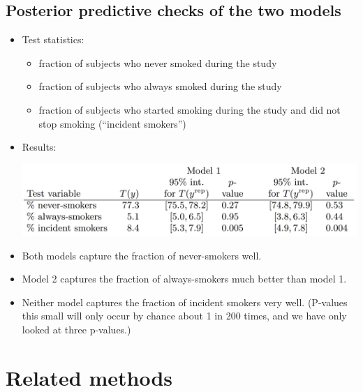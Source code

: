 \documentclass[12pt]{article}
\begin{document}
\subsection*{Posterior predictive checks of the two models}
\begin{itemize}
\item Test statistics:
\begin{itemize}
\item fraction of subjects who never smoked during the study
\item fraction of subjects who always smoked during the study
\item fraction of subjects who started smoking during the study and did not stop smoking (``incident smokers'')
\end{itemize}
\item Results:
\begin{center}
\includegraphics[width=1\textwidth]{smoking-results.png}
\end{center}
\item Both models capture the fraction of never-smokers well.
\item Model 2 captures the fraction of always-smokers much better than model 1.
\item Neither model captures the fraction of incident smokers very well. (P-values this small will only occur by chance about 1 in 200 times, and we have only looked at three p-values.)
\end{itemize}


\section{Related methods}
\end{document}
